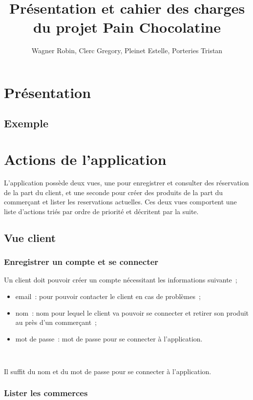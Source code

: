 \documentclass[a4paper,12pt]{article}
\title{Présentation et cahier des charges du projet Pain Chocolatine}
\author{Wagner Robin, Clerc Gregory, Pleinet Estelle, Porteries Tristan}
\begin{document}
\maketitle

\tableofcontents

\section{Présentation}

\subsection{Exemple}

\section{Actions de l'application}

L'application possède deux vues, une pour enregistrer et consulter des réservation de la part du client, et une seconde pour créer des produits de la part du commerçant et lister les reservations actuelles. Ces deux vues comportent une liste d'actions triés par ordre de priorité et décritent par la suite.

\subsection{Vue client}

\subsubsection{Enregistrer un compte et se connecter}

Un client doit pouvoir créer un compte nécessitant les informations suivante~;
\begin{itemize}
	\item email~: pour pouvoir contacter le client en cas de problèmes~;
	\item nom~: nom pour lequel le client va pouvoir se connecter et retirer son produit au près d'un commerçant~;
	\item mot de passe~: mot de passe pour se connecter à l'application.
\end{itemize} \

Il suffit du nom et du mot de passe pour se connecter à l'application.

\subsubsection{Lister les commerces}
\end{document}
